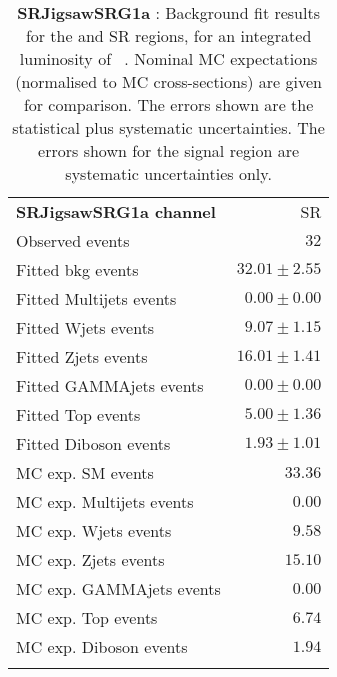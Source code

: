 

\begin{table}
\begin{center}
\setlength{\tabcolsep}{0.0pc}
{\tiny
\begin{tabular*}{\textwidth}{@{\extracolsep{\fill}}lr}
\noalign{\smallskip}\hline\noalign{\smallskip}
{\bf SRJigsawSRG1a channel}           & SR              \\[-0.05cm]
\noalign{\smallskip}\hline\noalign{\smallskip}
Observed events          & $32$                    \\
\noalign{\smallskip}\hline\noalign{\smallskip}
Fitted bkg events         & $32.01 \pm 2.55$              \\
\noalign{\smallskip}\hline\noalign{\smallskip}
        Fitted Multijets events         & $0.00 \pm 0.00$              \\
        Fitted Wjets events         & $9.07 \pm 1.15$              \\
        Fitted Zjets events         & $16.01 \pm 1.41$              \\
        Fitted GAMMAjets events         & $0.00 \pm 0.00$              \\
        Fitted Top events         & $5.00 \pm 1.36$              \\
        Fitted Diboson events         & $1.93 \pm 1.01$              \\
 \noalign{\smallskip}\hline\noalign{\smallskip}
MC exp. SM events              & $33.36$              \\
\noalign{\smallskip}\hline\noalign{\smallskip}
        MC exp. Multijets events         & $0.00$              \\
        MC exp. Wjets events         & $9.58$              \\
        MC exp. Zjets events         & $15.10$              \\
        MC exp. GAMMAjets events         & $0.00$              \\
        MC exp. Top events         & $6.74$              \\
        MC exp. Diboson events         & $1.94$              \\
\noalign{\smallskip}\hline\noalign{\smallskip}
\end{tabular*}
}
\end{center}
\caption{{\bf SRJigsawSRG1a} : Background fit results for the  and SR regions, for an integrated luminosity of \ourintlumi~\ifb. Nominal MC expectations (normalised to MC cross-sections) are given for comparison. The errors shown are the statistical plus systematic uncertainties. The errors shown for the signal region are systematic uncertainties only.}
\label{table.results.systematics.in.logL.fit.SR.SRJigsawSRG1a}
\end{table}
%